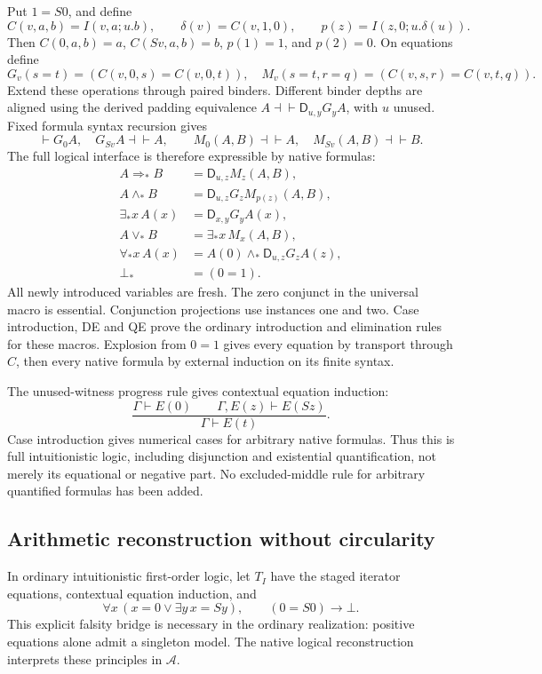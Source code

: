 \documentclass[11pt,letterpaper]{article}
\theoremstyle{definition}\newtheorem{definition}[theorem]{Definition}
\theoremstyle{remark}\newtheorem{remark}[theorem]{Remark}
\newcommand{\D}{\mathsf D}
\begin{document}
Put \(1=S0\), and define
\[
 C(v,a,b)=I(v,a;u.b),\qquad
 \delta(v)=C(v,1,0),\qquad
 p(z)=I(z,0;u.\delta(u)).
\]
Then \(C(0,a,b)=a\), \(C(Sv,a,b)=b\), \(p(1)=1\), and
\(p(2)=0\). On equations define
\[
 G_v(s=t)=(C(v,0,s)=C(v,0,t)),
 \quad
 M_v(s=t,r=q)=(C(v,s,r)=C(v,t,q)).
\]
Extend these operations through paired binders. Different binder depths
are aligned using the derived padding equivalence
\(A\dashv\vdash\D_{u,y}G_yA\), with \(u\) unused. Fixed formula
syntax recursion gives
\[
 \vdash G_0A,\quad G_{Sv}A\dashv\vdash A,\qquad
 M_0(A,B)\dashv\vdash A,\quad M_{Sv}(A,B)\dashv\vdash B.
\]
The full logical interface is therefore expressible by native formulas:
\begin{align*}
 A\Rightarrow_*B&=\D_{u,z}M_z(A,B),\\
 A\wedge_*B&=\D_{u,z}G_zM_{p(z)}(A,B),\\
 \exists_*x\,A(x)&=\D_{x,y}G_yA(x),\\
 A\vee_*B&=\exists_*x\,M_x(A,B),\\
 \forall_*x\,A(x)&=A(0)\wedge_*\D_{u,z}G_zA(z),\\
 \bot_*&=(0=1).
\end{align*}
All newly introduced variables are fresh. The zero conjunct in the
universal macro is essential. Conjunction projections use instances
one and two. Case introduction, DE and QE prove the ordinary
introduction and elimination rules for these macros. Explosion from
\(0=1\) gives every equation by transport through \(C\), then every
native formula by external induction on its finite syntax.

The unused-witness progress rule gives contextual equation induction:
\[
 \frac{\Gamma\vdash E(0)\qquad\Gamma,E(z)\vdash E(Sz)}
      {\Gamma\vdash E(t)}.
\]
Case introduction gives numerical cases for arbitrary native formulas.
Thus this is full intuitionistic logic, including disjunction and
existential quantification, not merely its equational or negative part.
No excluded-middle rule for arbitrary quantified formulas has been added.

\subsection{Arithmetic reconstruction without circularity}

In ordinary intuitionistic first-order logic, let \(T_I\) have the
staged iterator equations, contextual equation induction, and
\[
 \forall x\,(x=0\vee\exists y\,x=Sy),\qquad
 (0=S0)\to\bot.
\]
This explicit falsity bridge is necessary in the ordinary realization:
positive equations alone admit a singleton model. The native logical
reconstruction interprets these principles in \(\mathcal A\).
\end{document}
